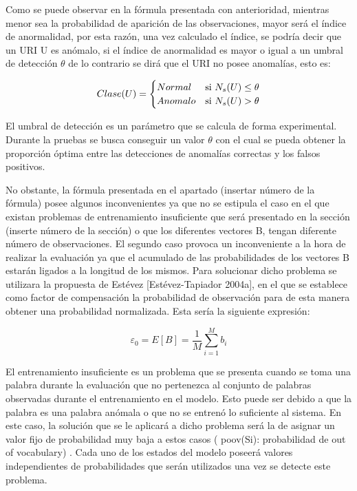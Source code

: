 Como se puede observar en la fórmula presentada con anterioridad, mientras menor sea la probabilidad de aparición de las observaciones, mayor será el índice de anormalidad, por esta razón, una vez calculado el índice, se podría decir que un URI U es anómalo, si el índice de anormalidad es mayor o igual a un umbral de detección $\theta$ de lo contrario se dirá que el URI no posee anomalías, esto es:

\begin{equation}
Clase(U) = 
	\begin{cases} 
      Normal & $si $  N_{s}(U) \leq \theta \\
      Anomalo & $si $  N_{s}(U) > \theta \\ 
   \end{cases}
\end{equation}


El umbral de detección es un parámetro que se calcula de forma experimental. Durante la pruebas se busca conseguir un valor $\theta$ con el cual se pueda obtener la proporción óptima entre las detecciones de anomalías correctas y los falsos positivos. 


No obstante, la fórmula presentada en el apartado (insertar número de la fórmula) posee algunos inconvenientes ya que no se estipula el caso en el que existan problemas de entrenamiento insuficiente que será presentado en la sección (inserte número de la sección) o que los diferentes vectores B, tengan diferente número de observaciones. El segundo caso provoca un inconveniente a la hora de realizar la evaluación ya que el acumulado de las probabilidades de los vectores B estarán ligados a la longitud de los mismos. Para solucionar dicho problema se utilizara la propuesta de Estévez [Estévez-Tapiador 2004a], en el que se establece como factor de compensación la probabilidad de observación para de esta manera obtener una probabilidad normalizada. Esta sería la siguiente expresión:

\begin{equation}
\varepsilon_{0} = E[B] = \frac{1}{M}\sum_{i=1}^{M}b_{i}
\end{equation}

El entrenamiento insuficiente es un problema que se presenta cuando se toma una palabra durante la evaluación que no pertenezca al conjunto de palabras observadas durante el entrenamiento en el modelo. Esto puede ser debido a que la palabra es una palabra anómala o que no se entrenó lo suficiente al sistema. En este caso, la solución que se le aplicará a dicho problema será la de asignar un valor fijo de probabilidad muy baja a estos casos ( poov(Si): probabilidad de out of vocabulary) . Cada uno de los estados del modelo poseerá valores independientes de probabilidades que serán utilizados una vez se detecte este problema.

